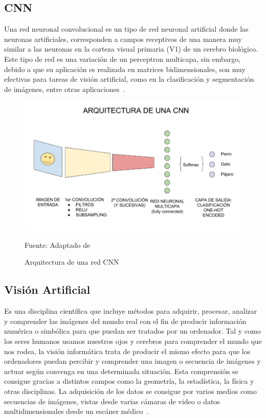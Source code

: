 \subsection{CNN}

Una red neuronal convolucional es un tipo de red neuronal artificial donde las neuronas artificiales, corresponden a campos receptivos de una manera muy similar a las neuronas en la corteza visual primaria (V1) de un cerebro biológico. Este tipo de red es una variación de un perceptron multicapa, sin embargo, debido a que su aplicación es realizada en matrices bidimensionales, son muy efectivas para tareas de visión artificial, como en la clasificación y segmentación de imágenes, entre otras aplicaciones~\cite{red_neuronal}.

\begin{figure}[htb]
	\centering
	\includegraphics[scale  = 0.80]{Imagenes/cnn.png}
	\caption{Arquitectura de una red CNN}{Fuente: Adaptado de~\cite{red_neuronal}}

\end{figure}

\subsection{Visión Artificial}

Es una disciplina científica que incluye métodos para adquirir, procesar, analizar y comprender las imágenes del mundo real con el fin de producir información numérica o simbólica para que puedan ser tratados por un ordenador. Tal y como los seres humanos usamos nuestros ojos y cerebros para comprender el mundo que nos rodea, la visión informática trata de producir el mismo efecto para que los ordenadores puedan percibir y comprender una imagen o secuencia de imágenes y actuar según convenga en una determinada situación. Esta comprensión se consigue gracias a distintos campos como la geometría, la estadística, la física y otras disciplinas. La adquisición de los datos se consigue por varios medios como secuencias de imágenes, vistas desde varias cámaras de video o datos multidimensionales desde un escáner médico~\cite{vision_artificial}.

